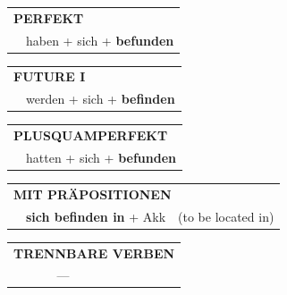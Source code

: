 \documentclass[10pt,a4paper]{revtex4-2}
\begin{document}
\begin{verbbox}
 \begin{tabular}{rl}
     \multicolumn{2}{l}{\textbf{PERFEKT}}\\
    &haben + sich + \textbf{befunden}\\
  \end{tabular}
\hfill
   \begin{tabular}{rl}
   
    \multicolumn{2}{l}{\textbf{FUTURE I} }\\
    &werden + sich + \textbf{befinden}\\
 
  \end{tabular}
\hfill
   \begin{tabular}{rl}
      \multicolumn{2}{l}{\textbf{PLUSQUAMPERFEKT}}\\
    &hatten + sich + \textbf{befunden}\\
  \end{tabular}
  
\vspace{10pt}

   \begin{tabular}{lll}
      \multicolumn{3}{l}{\textbf{MIT PRÄPOSITIONEN}}\\
& \textbf{sich befinden in} + Akk & (to be located in)
  \end{tabular}
  \hfill
   \begin{tabular}{lll}
      \multicolumn{3}{l}{\textbf{TRENNBARE VERBEN}}\\
& --- & \\
  \end{tabular}
  
  \vspace{-5pt}

\end{verbbox}
\end{document}
